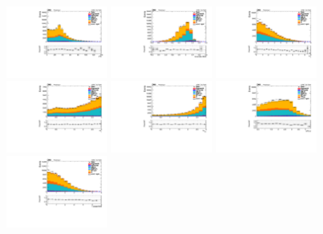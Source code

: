 \begin{figure}[tb]
	\begin{center}
		\includegraphics[width=0.3\textwidth]{fig/MVA/sc_all_VBF_PTt_valid_ptwei_cat0.pdf}
		\includegraphics[width=0.3\textwidth]{fig/MVA/sc_all_VBF_kinMVA_valid_ptwei_VBF_cat0.pdf}
		\includegraphics[width=0.3\textwidth]{fig/MVA/sc_all_VBF_dEtajj_valid_ptwei_VBF_cat0.pdf}
		\includegraphics[width=0.3\textwidth]{fig/MVA/sc_all_VBF_dPhijj_valid_ptwei_VBF_cat0.pdf}
		\includegraphics[width=0.3\textwidth]{fig/MVA/sc_all_VBF_dPhiZgjj_valid_ptwei_VBF_cat0.pdf}
		\includegraphics[width=0.3\textwidth]{fig/MVA/sc_all_VBF_dR_phojet_valid_ptwei_cat0.pdf}
		\includegraphics[width=0.3\textwidth]{fig/MVA/sc_all_VBF_Zeppen_pho_valid_ptwei_VBF_cat0.pdf}

\end{center}
\end{figure}
